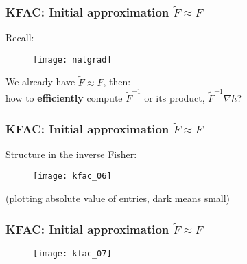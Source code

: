 \begin{frame}
\frametitle{KFAC: Initial approximation $\tilde{F} \approx F$}
Recall:
\begin{figure}
    \raggedright
    \texttt{[image: natgrad]}
\end{figure}

We already have $\tilde{F} \approx F$, then: \\
how to \textbf{efficiently} compute $\tilde{F}^{-1}$ or its product, $\tilde{F}^{-1}\nabla h$?
\end{frame}

\begin{frame}
\frametitle{KFAC: Initial approximation $\tilde{F} \approx F$}
Structure in the inverse Fisher:
\begin{figure}
    \centering
    \texttt{[image: kfac\_06]}
\end{figure}
(plotting absolute value of entries, dark means small)
\end{frame}

\begin{frame}
\frametitle{KFAC: Initial approximation $\tilde{F} \approx F$}
\begin{figure}
    \centering
    \texttt{[image: kfac\_07]}
\end{figure}
\end{frame}
